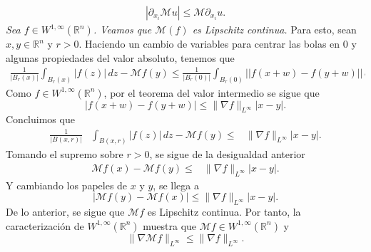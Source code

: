 \documentclass[final]{beamer}
\newlength{\colwidth}
\begin{document}
\begin{frame}[t]
\begin{columns}[t]
\begin{column}{\colwidth}
\begin{alertblock}{}
      \begin{align*}
        |\partial_{x_i}\mathcal{M}u|\leq \mathcal{M}\partial_{x_i}u.
      \end{align*}
      \emph{ Sea $f\in W^{1,\infty}(\mathbb{R}^n)$. Veamos que $\mathcal{M}(f)$ es Lipschitz continua.} Para esto, sean $x,y\in \mathbb{R}^n$ y $r>0$. Haciendo un cambio de variables para centrar las bolas en $0$ y algunas propiedades del valor absoluto, tenemos que
      \begin{align*}
        \frac{1}{|B_{r}(x)|}\int_{B_r(x)} |f(z)|\, dz-\mathcal{M}f(y)\leq \frac{1}{|B_{r}(0)|}\int_{B_{r}(0)} \Big||f(x+w)-f(y+w)|\Big|\, dw.
      \end{align*}
      Como $f\in W^{1,\infty}(\mathbb{R}^n)$, por el teorema del valor intermedio se sigue que
      \begin{equation*}
      \big|f(x+w)-f(y+w)\big|\leq \|\nabla f\|_{L^{\infty}} |x-y|.   
      \end{equation*}
      Concluimos que 
      \begin{equation*}
      \begin{aligned}
      \frac{1}{|B(x,r)|}&\int_{B(x,r)} |f(z)|\, dz-\mathcal{M}f(y)\leq & \|\nabla f\|_{L^{\infty}} |x-y|.
      \end{aligned}
      \end{equation*}
      Tomando el supremo sobre $r>0$, se sigue de la desigualdad anterior 
      \begin{equation*}
      \begin{aligned}
      \mathcal{M}f(x)-\mathcal{M}f(y)\leq & \|\nabla f\|_{L^{\infty}} |x-y|.
      \end{aligned}
      \end{equation*}
      Y cambiando los papeles de $x$ y $y$, se llega a
      \begin{equation*}
      \big|\mathcal{M}f(y)-\mathcal{M}f(x)\big| \leq \|\nabla f\|_{L^{\infty}} |x-y|.    
      \end{equation*}
      De lo anterior, se sigue que $\mathcal{M}f$ es Lipschitz continua. Por tanto, la caracterización de $W^{1,\infty}(\mathbb{R}^{n})$ muestra que $\mathcal{M}f\in W^{1,\infty}(\mathbb{R}^n)$ y
      \begin{equation*}
        \|\nabla \mathcal{M}f\|_{L^{\infty}}\leq \|\nabla f\|_{L^{\infty}}.  
      \end{equation*}
  \end{alertblock}


\end{column}
\end{columns}
\end{frame}
\end{document}
